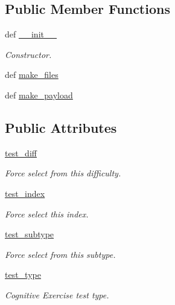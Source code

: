 \subsection*{Public Member Functions}
\begin{DoxyCompactItemize}
\item 
def \hyperlink{classRappCloud_1_1CloudMsgs_1_1CognitiveExerciseSelect_1_1CognitiveExerciseSelect_1_1Request_a79bf346fc9f4b3e0ab728a643e71ed20}{\-\_\-\-\_\-init\-\_\-\-\_\-}
\begin{DoxyCompactList}\small\item\em Constructor. \end{DoxyCompactList}\item 
def \hyperlink{classRappCloud_1_1CloudMsgs_1_1CognitiveExerciseSelect_1_1CognitiveExerciseSelect_1_1Request_afb8ddca7821b63edac37a124c19c6fa2}{make\-\_\-files}
\item 
def \hyperlink{classRappCloud_1_1CloudMsgs_1_1CognitiveExerciseSelect_1_1CognitiveExerciseSelect_1_1Request_a981f299f46c491b160bb9eb5c6627b4e}{make\-\_\-payload}
\end{DoxyCompactItemize}
\subsection*{Public Attributes}
\begin{DoxyCompactItemize}
\item 
\hyperlink{classRappCloud_1_1CloudMsgs_1_1CognitiveExerciseSelect_1_1CognitiveExerciseSelect_1_1Request_a3ba18b090a50fae8475fcbb64601df41}{test\-\_\-diff}
\begin{DoxyCompactList}\small\item\em Force select from this difficulty. \end{DoxyCompactList}\item 
\hyperlink{classRappCloud_1_1CloudMsgs_1_1CognitiveExerciseSelect_1_1CognitiveExerciseSelect_1_1Request_addf301147790ec1b4e78ac3d3a5fdcfd}{test\-\_\-index}
\begin{DoxyCompactList}\small\item\em Force select this index. \end{DoxyCompactList}\item 
\hyperlink{classRappCloud_1_1CloudMsgs_1_1CognitiveExerciseSelect_1_1CognitiveExerciseSelect_1_1Request_a6cc6c7d54269fb24d6641ed85871ff72}{test\-\_\-subtype}
\begin{DoxyCompactList}\small\item\em Force select from this subtype. \end{DoxyCompactList}\item 
\hyperlink{classRappCloud_1_1CloudMsgs_1_1CognitiveExerciseSelect_1_1CognitiveExerciseSelect_1_1Request_a3b20425469cab1bed890005026c4c4af}{test\-\_\-type}
\begin{DoxyCompactList}\small\item\em Cognitive Exercise test type. \end{DoxyCompactList}\end{DoxyCompactItemize}


